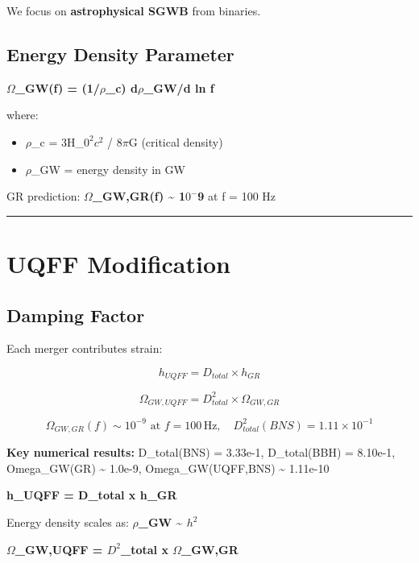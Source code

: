 \documentclass[12pt,a4paper]{article}
\begin{document}
We focus on \textbf{astrophysical SGWB} from binaries.

\subsection{Energy Density Parameter}

\textbf{$\Omega$\_GW(f) = (1/$\rho$\_c) d$\rho$\_GW/d ln f}

where:

\begin{itemize}
  \item $\rho$\_c = 3H\_$0^{2}$$c^{2}$ / 8$\pi$G (critical density)
  \item $\rho$\_GW = energy density in GW
\end{itemize}

GR prediction: \textbf{$\Omega$\_GW,GR(f) \textasciitilde{} 1$0^{-}$9} at f = 100 Hz

\medskip\hrule\medskip

\section{UQFF Modification}

\subsection{Damping Factor}

Each merger contributes strain:

\begin{equation}
h_{UQFF} = D_{total} \times h_{GR}
\end{equation}

\begin{equation}
\Omega_{GW,UQFF} = D^2_{total} \times \Omega_{GW,GR}
\end{equation}

\begin{equation}
\Omega_{GW,GR}(f) \sim 10^{-9}\text{ at }f=100\,\mathrm{Hz},\quad D^2_{total}(BNS) = 1.11\times10^{-1}
\end{equation}

\textbf{Key numerical results:} D\_total(BNS) = 3.33e-1, D\_total(BBH) = 8.10e-1, Omega\_GW(GR) \textasciitilde{} 1.0e-9, Omega\_GW(UQFF,BNS) \textasciitilde{} 1.11e-10

\textbf{h\_UQFF = D\_total x h\_GR}

Energy density scales as: \textbf{$\rho$\_GW \textasciitilde{}  $h^{2}$}

\textbf{$\Omega$\_GW,UQFF = $D^{2}$\_total x $\Omega$\_GW,GR}
\end{document}
